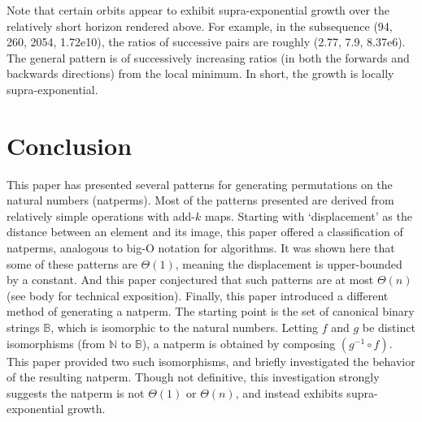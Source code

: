 \documentclass[12pt,reqno]{article}
\begin{document}
Note that certain orbits appear to exhibit supra-exponential growth over the relatively short horizon rendered above. For example, in the subsequence (94, 260, 2054, 1.72e10), the ratios of successive pairs are roughly (2.77, 7.9, 8.37e6). The general pattern is of successively increasing ratios (in both the forwards and backwards directions) from the local minimum. In short, the growth is locally supra-exponential.

\section{Conclusion}

This paper has presented several patterns for generating permutations on the natural numbers (natperms). Most of the patterns presented are derived from relatively simple operations with add-$k$ maps. Starting with `displacement' as the distance between an element and its image, this paper offered a classification of natperms, analogous to big-O notation for algorithms. It was shown here that some of these patterns are $\Theta(1)$, meaning the displacement is upper-bounded by a constant. And this paper conjectured that such patterns are at most $\Theta(n)$ (see body for technical exposition). Finally, this paper introduced a different method of generating a natperm. The starting point is the set of canonical binary strings $\mathbb{B}$, which is isomorphic to the natural numbers. Letting $f$ and $g$ be distinct isomorphisms (from $\mathbb{N}$ to $\mathbb{B}$), a natperm is obtained by composing $(g^{-1} \circ f)$. This paper provided two such isomorphisms, and briefly investigated the behavior of the resulting natperm. Though not definitive, this investigation strongly suggests the natperm is not $\Theta(1)$ or $\Theta(n)$, and instead exhibits supra-exponential growth.
\end{document}

